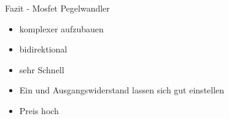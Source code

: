 
\begin{frame}[c]{Fazit - Mosfet Pegelwandler}

  \begin{itemize}
    \item komplexer aufzubauen
    \item bidirektional
    \item sehr Schnell
    \item Ein und Ausgangswiderstand lassen sich gut einstellen
    \item Preis hoch
  \end{itemize}

\end{frame}
